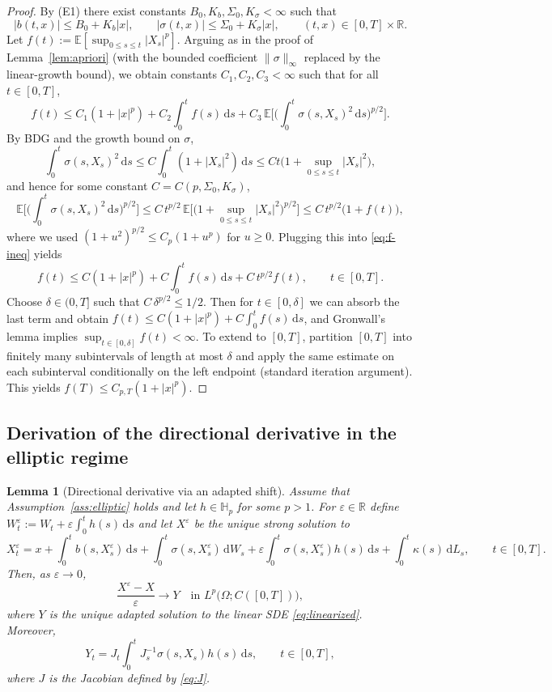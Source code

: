\documentclass[11pt]{article}
\newcommand{\R}{\mathbb{R}}
\newcommand{\E}{\mathbb{E}}
\newcommand{\Hb}{\mathbb{H}}
\newcommand{\1}{\mathbf{1}}
\newcommand{\dd}{\mathrm{d}}
\theoremstyle{plain}
\newtheorem{lemma}[theorem]{Lemma}
\theoremstyle{definition}
\theoremstyle{remark}
\begin{document}
\begin{proof}
By (E1) there exist constants $B_0,K_b,\Sigma_0,K_\sigma<\infty$ such that
\[
|b(t,x)|\le B_0+K_b|x|,\qquad |\sigma(t,x)|\le \Sigma_0+K_\sigma|x|,\qquad (t,x)\in[0,T]\times\R.
\]
Let $f(t):=\E[\sup_{0\le s\le t}|X_s|^p]$.
Arguing as in the proof of Lemma~\ref{lem:apriori} (with the bounded coefficient $\|\sigma\|_\infty$ replaced by the linear-growth bound),
we obtain constants $C_1,C_2,C_3<\infty$ such that for all $t\in[0,T]$,
\begin{equation}\label{eq:f-ineq}
f(t)\le C_1(1+|x|^p)+C_2\int_0^t f(s)\,\dd s
+ C_3\,\E\Big[\Big(\int_0^t \sigma(s,X_s)^2\,\dd s\Big)^{p/2}\Big].
\end{equation}
By BDG and the growth bound on $\sigma$,
\[
\int_0^t \sigma(s,X_s)^2\,\dd s \le C\int_0^t (1+|X_s|^2)\,\dd s
\le C t\big(1+\sup_{0\le s\le t}|X_s|^2\big),
\]
and hence for some constant $C=C(p,\Sigma_0,K_\sigma)$,
\[
\E\Big[\Big(\int_0^t \sigma(s,X_s)^2\,\dd s\Big)^{p/2}\Big]
\le C\,t^{p/2}\,\E\Big[\big(1+\sup_{0\le s\le t}|X_s|^2\big)^{p/2}\Big]
\le C\,t^{p/2}\big(1+f(t)\big),
\]
where we used $(1+u^2)^{p/2}\le C_p(1+u^p)$ for $u\ge0$.
Plugging this into \eqref{eq:f-ineq} yields
\[
f(t)\le C(1+|x|^p)+C\int_0^t f(s)\,\dd s + C\,t^{p/2}f(t),\qquad t\in[0,T].
\]
Choose $\delta\in(0,T]$ such that $C\,\delta^{p/2}\le 1/2$.
Then for $t\in[0,\delta]$ we can absorb the last term and obtain
$f(t)\le C(1+|x|^p)+C\int_0^t f(s)\,\dd s$, and Gronwall's lemma implies $\sup_{t\in[0,\delta]}f(t)<\infty$.
To extend to $[0,T]$, partition $[0,T]$ into finitely many subintervals of length at most $\delta$
and apply the same estimate on each subinterval conditionally on the left endpoint (standard iteration argument).
This yields $f(T)\le C_{p,T}(1+|x|^p)$.
\end{proof}

\subsection{Derivation of the directional derivative in the elliptic regime}


\begin{lemma}[Directional derivative via an adapted shift]\label{lem:DXrep}
Assume that Assumption~\ref{ass:elliptic} holds and let $h\in \Hb_p$ for some $p>1$.
For $\varepsilon\in\R$ define $W_t^\varepsilon:=W_t+\varepsilon\int_0^t h(s)\,\dd s$ and let $X^\varepsilon$ be the unique strong
solution to
\begin{equation}\label{eq:SDE-eps}
X_t^\varepsilon=x+\int_0^t b(s,X_s^\varepsilon)\,\dd s+\int_0^t \sigma(s,X_s^\varepsilon)\,\dd W_s
+\varepsilon\int_0^t \sigma(s,X_s^\varepsilon)h(s)\,\dd s+\int_0^t \kappa(s)\,\dd L_s,\qquad t\in[0,T].
\end{equation}
Then, as $\varepsilon\to0$,
\[
\frac{X^\varepsilon-X}{\varepsilon}\longrightarrow Y
\quad\text{in }L^p\big(\Omega;C([0,T])\big),
\]
where $Y$ is the unique adapted solution to the linear SDE \eqref{eq:linearized}.
Moreover,
\[
Y_t=J_t\int_0^t J_s^{-1}\sigma(s,X_s)h(s)\,\dd s,\qquad t\in[0,T],
\]
where $J$ is the Jacobian defined by \eqref{eq:J}.
\end{lemma}
\end{document}
